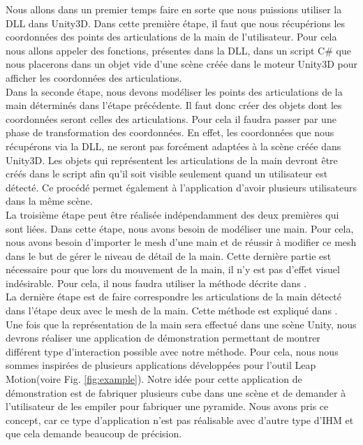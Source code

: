 Nous allons dans un premier temps faire en sorte que nous puissions utiliser la DLL dans Unity3D.
Dans cette première étape, il faut que nous récupérions les coordonnées des points des articulations
de la main de l'utilisateur. Pour cela nous allons appeler des fonctions, présentes dans la DLL, dans un 
script C\# que nous placerons dans un objet vide d'une scène créée dans le moteur Unity3D pour
afficher les coordonnées des articulations.\\

Dans la seconde étape, nous devons modéliser les points des articulations de la main déterminés 
dans l'étape précédente. Il faut donc créer des objets dont les coordonnées seront celles des articulations.
Pour cela il faudra passer par une phase de transformation des coordonnées. En effet, les coordonnées
que nous récupérons via la DLL, ne seront pas forcément adaptées à la scène créée dans Unity3D. Les 
objets qui représentent les articulations de la main devront être créés dans le script afin qu'il 
soit visible seulement quand un utilisateur est détecté. Ce procédé permet également à l'application
d'avoir plusieurs utilisateurs dans la même scène.\\

La troisième étape peut être réalisée indépendamment des deux premières qui sont liées. Dans cette étape,
nous avons besoin de modéliser une main. Pour cela, nous avons besoin d'importer le mesh d'une main et
de réussir à modifier ce mesh dans le but de gérer le niveau de détail de la main. Cette dernière
partie est nécessaire pour que lors du mouvement de la main, il n'y est pas d'effet visuel indésirable.
Pour cela, il nous faudra utiliser la méthode décrite dans \cite{export:217428}.\\

La dernière étape est de faire correspondre les articulations de la main détecté dans l'étape deux avec
le mesh de la main. Cette méthode est expliqué dans \cite{export:217428}.\\

Une fois que la représentation de la main sera effectué dans une scène Unity, nous devrons réaliser une 
application de démonstration permettant de montrer différent type d'interaction possible avec notre 
méthode. Pour cela, nous nous sommes inspirées de plusieurs applications développées pour l'outil
Leap Motion(voire Fig. \ref{fig:example}). Notre idée pour cette application de démonstration est de fabriquer plusieurs cube dans 
une scène et de demander à l'utilisateur de les empiler pour fabriquer une pyramide. Nous avons pris
ce concept, car ce type d'application n'est pas réalisable avec d'autre type d'IHM et que cela demande
beaucoup de précision.

